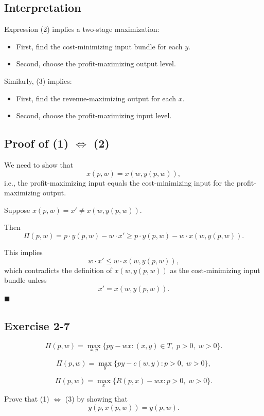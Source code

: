 \subsection*{Interpretation}

Expression (2) implies a two-stage maximization:

\begin{itemize}
    \item First, find the cost-minimizing input bundle for each $y$.
    \item Second, choose the profit-maximizing output level.
\end{itemize}

Similarly, (3) implies:

\begin{itemize}
    \item First, find the revenue-maximizing output for each $x$.
    \item Second, choose the profit-maximizing input level.
\end{itemize}

\subsection*{Proof of (1) $\Leftrightarrow$ (2)}

We need to show that
\[
x(p,w) = x(w, y(p,w)),
\]
i.e., the profit-maximizing input equals the cost-minimizing input
for the profit-maximizing output.

Suppose $x(p,w)=x' \ne x(w,y(p,w))$.

Then
\[
\Pi(p,w)
=
p\cdot y(p,w) - w\cdot x'
\ge
p\cdot y(p,w) - w\cdot x(w,y(p,w)).
\]

This implies
\[
w\cdot x' \le w\cdot x(w,y(p,w)),
\]
which contradicts the definition of $x(w,y(p,w))$ as the
cost-minimizing input bundle unless
\[
x' = x(w,y(p,w)).
\]
\hfill $\blacksquare$

\begin{tcolorbox}[breakable]

\subsection*{Exercise 2-7}

\begin{equation}
\Pi(p,w)=\max_{x,y}\{py-wx : (x,y)\in T,\; p>0,\; w>0\}. \tag{1}
\end{equation}

\begin{equation}
\Pi(p,w)=\max_{y}\{py-c(w,y) : p>0,\; w>0\}, \tag{2}
\end{equation}

\begin{equation}
\Pi(p,w)=\max_{x}\{R(p,x)-wx : p>0,\; w>0\}. \tag{3}
\end{equation}

Prove that (1) $\iff$ (3) by showing that
\[
y(p,x(p,w)) = y(p,w).
\]
\end{tcolorbox}

